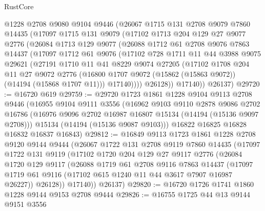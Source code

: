 \begin{lexlean}{RustCore}
\begin{coremodule}
    @1228
    @2708
    @9080
    @9104
    @9446
    (@26067
      @1715
      @131
      @2708
      @9079
      @7860
      @14435
      (@17097
        @1715
        @131
        @9079
        (@17102
          @1713
          @204
          @129
          @27
          @9077
          @2776
          (@26084
            @1713
            @129
            @9077
            (@26088
              @1712
              @61
              @2708
              @9076
              @7863
              @14437
              (@17097
                @1712
                @61
                @9076
                (@17102
                  @728
                  @1711
                  @11
                  @44
                  @3988
                  @9075
                  @29621
                  (@27191
                    @1710
                    @11
                    @41
                    @8229
                    @9074
                    @27205
                    (@17102
                      @1708
                      @204
                      @11
                      @27
                      @9072
                      @2776
                      (@16800 @1707 @9072 (@15862 (@15863 @9072)) (@14194 (@15868 @1707 @11)))
                      @17140))))
              @26128))
          @17140))
      @26137)
@29720 := @16720 @619
@29759 := @29720
    @1723
    @1861
    @1228
    @9104
    @9113
    @2708
    @9446
    (@16955
      @9104
      @9111
      @3556
      (@16962
        @9103
        @9110
        @2878
        @9086
        @2702
        @16786
        (@16976 @9096 @2702 @16987 @16807 @15134 (@14194 (@15136 @9097 @2708)))
        @15134
        (@14194 (@15136 @9087 @9103)))
      @16822
      @16825
      @16828
      @16832
      @16837
      @16843)
@29812 := @16849
    @9113
    @1723
    @1861
    @1228
    @2708
    @9120
    @9144
    @9444
    (@26067
      @1722
      @131
      @2708
      @9119
      @7860
      @14435
      (@17097
        @1722
        @131
        @9119
        (@17102
          @1720
          @204
          @129
          @27
          @9117
          @2776
          (@26084
            @1720
            @129
            @9117
            (@26088
              @1719
              @61
              @2708
              @9116
              @7863
              @14437
              (@17097 @1719 @61 @9116 (@17102 @615 @1240 @11 @44 @3617 @7907 @16987 @26227))
              @26128))
          @17140))
      @26137)
@29820 := @16720 @1726 @1741 @1860 @1228 @9144 @9153 @2708 @9444
@29826 := @16755 @1725 @44 @13 @9144 @9151 @3556

\end{coremodule}
\end{lexlean}
